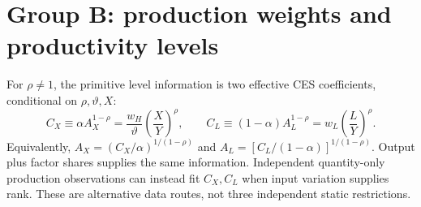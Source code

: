 \documentclass[10pt,a4paper,landscape]{article}
\begin{document}
\clearpage
\section{Group B: production weights and productivity levels}\label{sec:scales}
For $\rho\ne1$, the primitive level information is two effective CES coefficients, conditional on $\rho,\vartheta,X$:
\begin{equation}\label{eq:levels}
 C_X\equiv\alpha A_X^{1-\rho}=\frac{w_H}{\vartheta}\left(\frac X Y\right)^\rho,
 \qquad C_L\equiv(1-\alpha)A_L^{1-\rho}=w_L\left(\frac L Y\right)^\rho.
 \tag{P4}
\end{equation}
Equivalently, $A_X=(C_X/\alpha)^{1/(1-\rho)}$ and $A_L=[C_L/(1-\alpha)]^{1/(1-\rho)}$. Output plus factor shares supplies the same information. Independent quantity-only production observations can instead fit $C_X,C_L$ when input variation supplies rank. These are alternative data routes, not three independent static restrictions.
\end{document}
